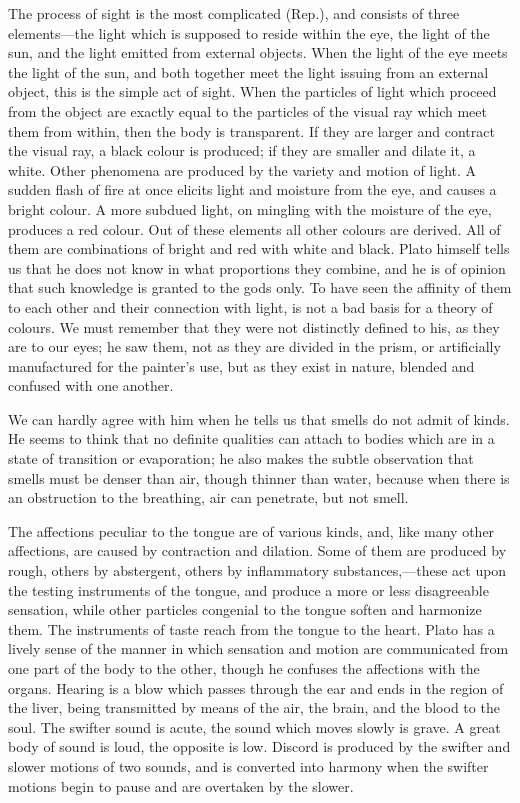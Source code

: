 \documentclass[11pt,letter]{article}
\begin{document}
\par  The process of sight is the most complicated (Rep.), and consists of three elements—the light which is supposed to reside within the eye, the light of the sun, and the light emitted from external objects. When the light of the eye meets the light of the sun, and both together meet the light issuing from an external object, this is the simple act of sight. When the particles of light which proceed from the object are exactly equal to the particles of the visual ray which meet them from within, then the body is transparent. If they are larger and contract the visual ray, a black colour is produced; if they are smaller and dilate it, a white. Other phenomena are produced by the variety and motion of light. A sudden flash of fire at once elicits light and moisture from the eye, and causes a bright colour. A more subdued light, on mingling with the moisture of the eye, produces a red colour. Out of these elements all other colours are derived. All of them are combinations of bright and red with white and black. Plato himself tells us that he does not know in what proportions they combine, and he is of opinion that such knowledge is granted to the gods only. To have seen the affinity of them to each other and their connection with light, is not a bad basis for a theory of colours. We must remember that they were not distinctly defined to his, as they are to our eyes; he saw them, not as they are divided in the prism, or artificially manufactured for the painter’s use, but as they exist in nature, blended and confused with one another.

\par  We can hardly agree with him when he tells us that smells do not admit of kinds. He seems to think that no definite qualities can attach to bodies which are in a state of transition or evaporation; he also makes the subtle observation that smells must be denser than air, though thinner than water, because when there is an obstruction to the breathing, air can penetrate, but not smell.

\par  The affections peculiar to the tongue are of various kinds, and, like many other affections, are caused by contraction and dilation. Some of them are produced by rough, others by abstergent, others by inflammatory substances,—these act upon the testing instruments of the tongue, and produce a more or less disagreeable sensation, while other particles congenial to the tongue soften and harmonize them. The instruments of taste reach from the tongue to the heart. Plato has a lively sense of the manner in which sensation and motion are communicated from one part of the body to the other, though he confuses the affections with the organs. Hearing is a blow which passes through the ear and ends in the region of the liver, being transmitted by means of the air, the brain, and the blood to the soul. The swifter sound is acute, the sound which moves slowly is grave. A great body of sound is loud, the opposite is low. Discord is produced by the swifter and slower motions of two sounds, and is converted into harmony when the swifter motions begin to pause and are overtaken by the slower.
\end{document}
